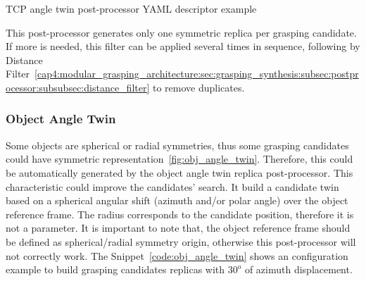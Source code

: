 \begin{snippet}[h!]
\centering
{}
\caption{TCP angle twin post-processor YAML descriptor example}
\label{code:tcp_angle_twin}
\end{snippet}


This post-processor generates only one symmetric replica per grasping candidate. If more is needed, this filter can be applied several times in sequence, following by Distance Filter~\ref{cap4:modular_grasping_architecture:sec:grasping_synthesis:subsec:postprocessor:subsubsec:distance_filter} to remove duplicates.

\subsubsection{Object Angle Twin}
\label{cap4:modular_grasping_architecture:sec:grasping_synthesis:subsec:postprocessor:subsubsec:obj_angle_twin}

Some objects are spherical or radial symmetries, thus some grasping candidates could have symmetric representation~\ref{fig:obj_angle_twin}. Therefore, this could be automatically generated by the object angle twin replica post-processor. This characteristic could improve the candidates' search. It build a candidate twin based on a spherical angular shift (azimuth and/or polar angle) over the object reference frame. The radius corresponds to the candidate position, therefore it is not a parameter. It is important to note that, the object reference frame should be defined as spherical/radial symmetry origin, otherwise this post-processor will not correctly work. The Snippet~\ref{code:obj_angle_twin} shows an configuration example to build grasping candidates replicas with $30^o$ of azimuth displacement.


